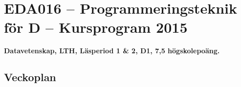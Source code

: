 \documentclass[a4paper,11pt,oneside]{memoir}
\begin{document}
\section*{EDA016 -- Programmeringsteknik för D  -- Kursprogram 2015}
\textbf{Datavetenskap, LTH, Läsperiod 1 \& 2, D1, 7,5 högskolepoäng.}\\



\subsection*{Veckoplan}

\end{document}
